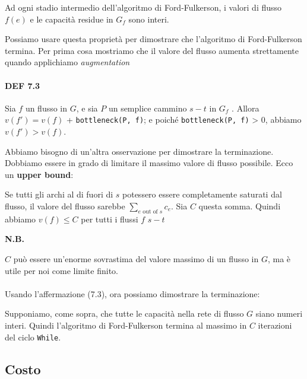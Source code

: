 \begin{myblockquote}
	Ad ogni stadio intermedio dell'algoritmo di Ford-Fulkerson, i valori di
	flusso $f(e)$ e le capacità residue in $G_f$ sono interi.
\end{myblockquote}

Possiamo usare questa proprietà per dimostrare che l'algoritmo di
Ford-Fulkerson termina. Per prima cosa mostriamo che il valore del
flusso aumenta strettamente quando applichiamo \emph{augmentation}

\paragraph{DEF 7.3}
\begin{myblockquote}
	Sia $f$ un flusso in $G$, e sia $P$ un semplice cammino $s-t$ in
	$G_f$ . Allora $v(f') = v(f)$ + \texttt{bottleneck(P,\ f)}; e poiché
	\texttt{bottleneck(P,\ f)} \textgreater{} 0, abbiamo $v(f') > v(f)$.
\end{myblockquote}

Abbiamo bisogno di un'altra osservazione per dimostrare la terminazione.
Dobbiamo essere in grado di limitare il massimo valore di flusso
possibile. Ecco un \textbf{upper bound}:

\begin{myblockquote}
	Se tutti gli archi al di
	fuori di $s$ potessero essere completamente saturati dal flusso, il
	valore del flusso sarebbe $\sum_{e \text{ out of }s} c_e$. Sia $C$
	questa somma. Quindi abbiamo $v(f) \le C$ per tutti i flussi $f$
	$s-t$
\end{myblockquote}

\textbf{N.B.}

$C$ può essere un'enorme sovrastima del valore massimo
di un flusso in $G$, ma è utile per noi come limite finito.
\\
\\
Usando l'affermazione (7.3), ora possiamo dimostrare la terminazione:

\begin{myblockquote}
	Supponiamo, come sopra, che tutte le capacità nella rete
	di flusso $G$ siano numeri interi. Quindi l'algoritmo di
	Ford-Fulkerson termina al massimo in $C$ iterazioni del ciclo
	\texttt{While}.
\end{myblockquote}


\subsection{Costo}

